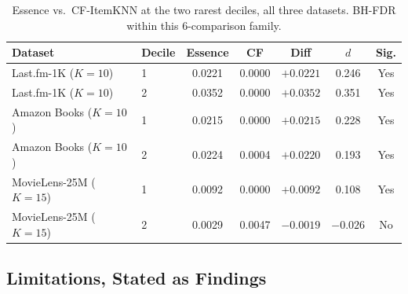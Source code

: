 \documentclass{article}
\begin{document}
\begin{table}[t]
\centering
\caption{Essence vs.\ CF-ItemKNN at the two rarest deciles, all three datasets. BH-FDR within this 6-comparison family.}
\label{tab:coldstart}
\small
\begin{tabular}{llccccc}
\toprule
\textbf{Dataset} & \textbf{Decile} & \textbf{Essence} & \textbf{CF} & \textbf{Diff} & $d$ & \textbf{Sig.} \\
\midrule
Last.fm-1K ($K{=}10$) & 1 & 0.0221 & 0.0000 & $+0.0221$ & 0.246 & Yes \\
Last.fm-1K ($K{=}10$) & 2 & 0.0352 & 0.0000 & $+0.0352$ & 0.351 & Yes \\
Amazon Books ($K{=}10$) & 1 & 0.0215 & 0.0000 & $+0.0215$ & 0.228 & Yes \\
Amazon Books ($K{=}10$) & 2 & 0.0224 & 0.0004 & $+0.0220$ & 0.193 & Yes \\
MovieLens-25M ($K{=}15$) & 1 & 0.0092 & 0.0000 & $+0.0092$ & 0.108 & Yes \\
MovieLens-25M ($K{=}15$) & 2 & 0.0029 & 0.0047 & $-0.0019$ & $-0.026$ & No \\
\bottomrule
\end{tabular}
\end{table}

\subsection{Limitations, Stated as Findings}
\label{sec:limitations-findings}
\end{document}
